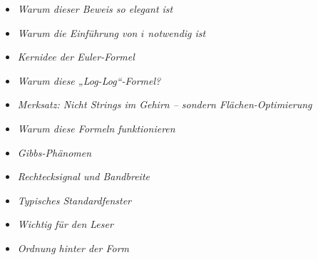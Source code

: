 \begin{DidacticBox}[Didaktikboxen]
	\begin{itemize}
		\item \emph{Warum dieser Beweis so elegant ist}\dotfill \pageref{box:beweis-elegant}
		\item \emph{Warum die Einführung von \(i\) notwendig ist}\dotfill \pageref{box:i-notwendig}
		\item \emph{Kernidee der Euler-Formel}\dotfill \pageref{box:euler-kernidee}
		\item \emph{Warum diese „Log-Log“-Formel?}\dotfill \pageref{box:mandelbrot-loglog}
		\item \emph{Merksatz: Nicht Strings im Gehirn -- sondern \newline Flächen-Optimierung}\dotfill \pageref{box:stringtheorie-flaechenoptimierung}
		\item \emph{Warum diese Formeln funktionieren}\dotfill \pageref{box:anhangA-fourier-koeffizienten}
		\item \emph{Gibbs-Phänomen}\dotfill \pageref{box:anhangA-fourier-gibbs}
	\end{itemize}
\end{DidacticBox}

\begin{PhysicsBox}[Physikboxen]
	\begin{itemize}
		\item \emph{Rechtecksignal und Bandbreite}\dotfill \pageref{box:anhangA-fourier-bandbreite}
	\end{itemize}
\end{PhysicsBox}

\begin{NoteBox}[Hinweisboxen]
	\begin{itemize}
		\item \emph{Typisches Standardfenster}\dotfill \pageref{box:mandelbrot-standardfenster}
		\item \emph{Wichtig für den Leser}\dotfill \pageref{box:mandelbrot-leserhinweis}
		\item \emph{Ordnung hinter der Form}\dotfill \pageref{box:anhangA-fourier-ordnung-form}
	\end{itemize}
\end{NoteBox}